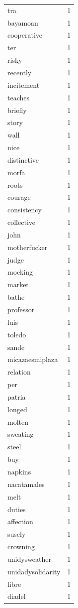 \begin{tabular}{lr}
tra & 1 \\
bayamoan & 1 \\
cooperative & 1 \\
ter & 1 \\
risky & 1 \\
recently & 1 \\
incitement & 1 \\
teaches & 1 \\
briefly & 1 \\
story & 1 \\
wall & 1 \\
nice & 1 \\
distinctive & 1 \\
morfa & 1 \\
roots & 1 \\
courage & 1 \\
consistency & 1 \\
collective & 1 \\
john & 1 \\
motherfucker & 1 \\
judge & 1 \\
mocking & 1 \\
market & 1 \\
bathe & 1 \\
professor & 1 \\
luis & 1 \\
toledo & 1 \\
sande & 1 \\
micazaesmiplaza & 1 \\
relation & 1 \\
per & 1 \\
patria & 1 \\
longed & 1 \\
molten & 1 \\
sweating & 1 \\
steel & 1 \\
buy & 1 \\
napkins & 1 \\
nacatamales & 1 \\
melt & 1 \\
duties & 1 \\
affection & 1 \\
susely & 1 \\
crowning & 1 \\
unidysweather & 1 \\
unidadysolidarity & 1 \\
libre & 1 \\
diadel & 1 \\

\end{tabular}
